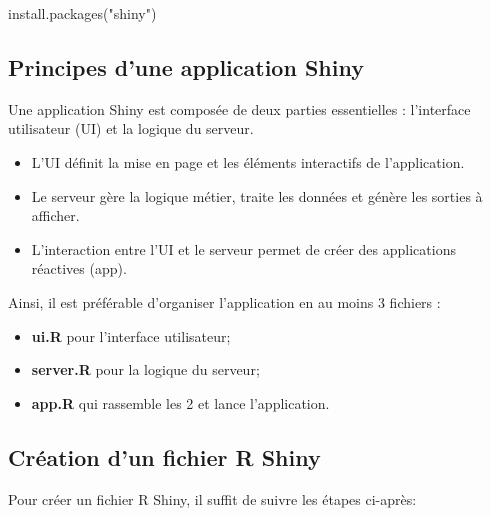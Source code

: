 \documentclass[
]{article}
\newenvironment{Shaded}{\begin{snugshade}}{\end{snugshade}}
\newcommand{\FunctionTok}[1]{\textcolor[rgb]{0.00,0.00,0.00}{#1}}
\newcommand{\NormalTok}[1]{#1}
\newcommand{\StringTok}[1]{\textcolor[rgb]{0.31,0.60,0.02}{#1}}
\begin{document}
\begin{Shaded}
\begin{Highlighting}[]
\FunctionTok{install.packages}\NormalTok{(}\StringTok{"shiny"}\NormalTok{)}
\end{Highlighting}
\end{Shaded}

\hypertarget{principes-dune-application-shiny}{%
\subsection{Principes d'une application
Shiny}\label{principes-dune-application-shiny}}

Une application Shiny est composée de deux parties essentielles :
l'interface utilisateur (UI) et la logique du serveur.

\begin{itemize}
\item
  L'UI définit la mise en page et les éléments interactifs de
  l'application.
\item
  Le serveur gère la logique métier, traite les données et génère les
  sorties à afficher.
\item
  L'interaction entre l'UI et le serveur permet de créer des
  applications réactives (app).
\end{itemize}

Ainsi, il est préférable d'organiser l'application en au moins 3
fichiers :

\begin{itemize}
\item
  \textbf{ui.R} pour l'interface utilisateur;
\item
  \textbf{server.R} pour la logique du serveur;
\item
  \textbf{app.R} qui rassemble les 2 et lance l'application.
\end{itemize}

\hypertarget{cruxe9ation-dun-fichier-r-shiny}{%
\subsection{Création d'un fichier R
Shiny}\label{cruxe9ation-dun-fichier-r-shiny}}

Pour créer un fichier R Shiny, il suffit de suivre les étapes ci-après:
\end{document}
